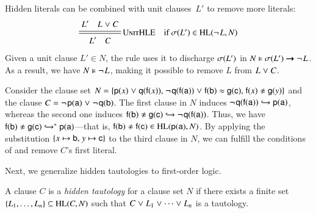 Hidden literals can be combined with unit clauses~$L'$ to remove more literals:
\[\namedsimpsc{UnitHLE}{L' \quad L \cor C}{L' \quad C}{\sigmaterm{L'} \in \HL(\neglit{L},N)}
\]
%
Given a unit clause $L' \in N$, the rule uses it to discharge $\sigmaterm{L'}$ in
$N \models \sigmaterm{L'} \impl \neglit{L}$. As a result, we have $N \models
\neglit{L}$, making it possible to remove $L$ from $L \cor C$.


\begin{exa}
   \label{example:unithle}
   Consider the clause set $N = \{\cst{p}(x) \cor \cst{q}(\cst{f}(x)){,}\;
   \neglit{\cst{q}(\cst{f}(\cst{a}))} \cor \eqlit{\cst{f}(\cst{b})}{\cst{g}(\cst{c})}{,}\;
   \neqlit{\cst{f}(x)}{\cst{g}(y)}\}$ and the clause $C = \neglit{\cst{p}(\cst{a})} \cor
   \neglit{\cst{q}(\cst{b})}$. The first clause in $N$ induces
   $\neglit{\cst{q}(\cst{f}(\cst{a}))} \bigfimpl{N} \cst{p}(\cst{a})$, whereas
   the second one induces $\neqlit{\cst{f}(\cst{b})}{\cst{g}(\cst{c})} \bigfimpl{N}
   \neglit{\cst{q}(\cst{f}(\cst{a}))}$. Thus, we have $\neqlit{\cst{f}(\cst{b})}{\cst{g}(\cst{c})}
   \bigfimpl{N}^\ast \cst{p}(\cst{a})$---that is, $\neqlit{\cst{f}(\cst{b})}{\cst{f}(\cst{c})} \in
   \HL(\cst{p}(\cst{a}), N)$. By applying the substitution $\{x \mapsto \cst{b}{,}\allowbreak\; y
   \mapsto \cst{c}\}$ to the third clause in $N$, we can fulfill the conditions of
    and remove $C$'s first literal.
\end{exa}

Next, we generalize hidden tautologies to first-order logic.

\begin{defi}
   A clause $C$ is a \emph{hidden tautology} for a clause set $N$ if there
   exists a finite set $\{L_1,\dots,L_n\} \subseteq \HL(C,N)$ such that
   $C \cor L_1 \cor \cdots \cor L_n$ is a tautology.
\end{defi}

